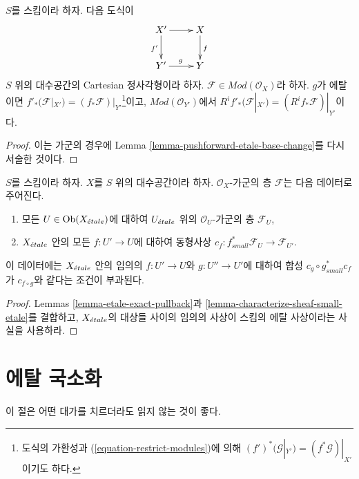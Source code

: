 \begin{lemma}
\label{lemma-pushforward-etale-base-change-modules}
$S$를 스킴이라 하자. 다음 도식이
$$
\xymatrix{
X' \ar[r] \ar[d]_{f'} & X \ar[d]^f \\
Y' \ar[r]^g & Y
}
$$
$S$ 위의 대수공간의 Cartesian 정사각형이라 하자.
$\mathcal{F} \in \textit{Mod}(\mathcal{O}_X)$라 하자. $g$가 에탈이면
$f'_*(\mathcal{F}|_{X'}) = (f_*\mathcal{F})|_{Y'}$\footnote{도식의
가환성과 (\ref{equation-restrict-modules})에 의해
$(f')^*(\mathcal{G}|_{Y'}) = (f^*\mathcal{G})|_{X'}$이기도 하다.}이고,
$\textit{Mod}(\mathcal{O}_{Y'})$에서
$R^if'_*(\mathcal{F}|_{X'}) = (R^if_*\mathcal{F})|_{Y'}$이다.
\end{lemma}

\begin{proof}
이는 가군의 경우에 Lemma
\ref{lemma-pushforward-etale-base-change}를 다시 서술한 것이다.
\end{proof}

\begin{lemma}
\label{lemma-characterize-module-small-etale}
$S$를 스킴이라 하자. $X$를 $S$ 위의 대수공간이라 하자.
$\mathcal{O}_X$-가군의 층 $\mathcal{F}$는 다음 데이터로 주어진다.
\begin{enumerate}
\item 모든 $U \in \mathop{\mathrm{Ob}}\nolimits(X_{\acute{e}tale})$에 대하여 $U_{\acute{e}tale}$ 위의
$\mathcal{O}_U$-가군의 층 $\mathcal{F}_U$,
\item $X_{\acute{e}tale}$ 안의 모든 $f : U' \to U$에 대하여 동형사상
$c_f : f_{small}^*\mathcal{F}_U \to \mathcal{F}_{U'}$.
\end{enumerate}
이 데이터에는 $X_{\acute{e}tale}$ 안의 임의의 $f : U' \to U$와
$g : U'' \to U'$에 대하여 합성 $c_g \circ g_{small}^*c_f$가
$c_{f \circ g}$와 같다는 조건이 부과된다.
\end{lemma}

\begin{proof}
Lemmas \ref{lemma-etale-exact-pullback}과
\ref{lemma-characterize-sheaf-small-etale}를 결합하고,
$X_{\acute{e}tale}$의 대상들 사이의 임의의 사상이 스킴의 에탈 사상이라는
사실을 사용하라.
\end{proof}


\section{에탈 국소화}
\label{section-localize}

\noindent
이 절은 어떤 대가를 치르더라도 읽지 않는 것이 좋다.

